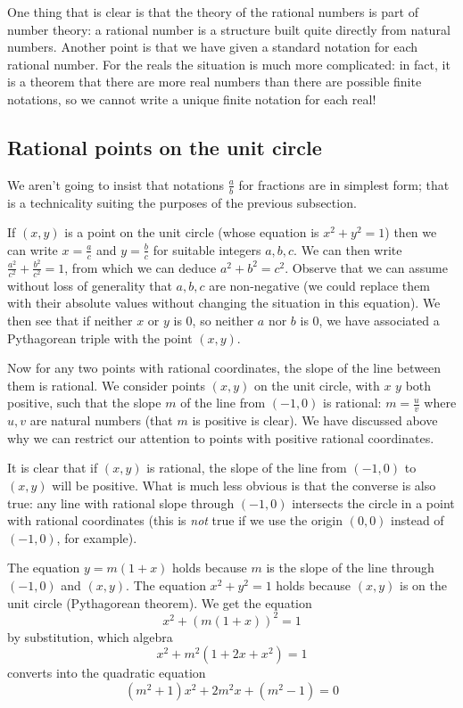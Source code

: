 \documentclass[12pt]{article}
\begin{document}
One thing that is clear is that the theory of the rational numbers is part of number theory:  a rational number is a structure built quite directly from natural numbers.  Another point is that we have given a standard notation for each rational number.   For the reals the situation is much more complicated:  in fact, it is a theorem that there are more real numbers than there are possible finite notations, so we cannot write a unique finite notation for each real!




\subsection{Rational points on the unit circle}

We aren't going to insist that notations $\frac ab$ for fractions are in simplest form; that is a technicality suiting the purposes of the previous subsection.

If $(x,y)$ is a point on the unit circle (whose equation is $x^2+y^2=1$) then we can write $x=\frac ac$ and $y=\frac bc$ for suitable integers $a,b,c$.  We can then write $\frac {a^2}{c^2} + \frac{b^2}{c^2}=1$, from which we can
deduce $a^2+b^2=c^2$.  Observe that we can assume without loss of generality that $a,b,c$ are non-negative
(we could replace them with their absolute values without changing the situation in this equation).  We then see that
if neither $x$ or $y$ is 0, so neither $a$ nor $b$ is 0, we have associated a Pythagorean triple with the point $(x,y)$.

Now for any two points with rational coordinates, the slope of the line between them is rational.  We consider
points $(x,y)$ on the unit circle, with $x$ $y$ both positive, such that the slope $m$ of the line from $(-1,0)$ is rational: $m=\frac uv$ where $u,v$ are natural numbers (that $m$ is positive is clear).  We have discussed above why we can restrict our attention to points with positive rational coordinates.

It is clear that if $(x,y)$ is rational, the slope of the line from $(-1,0)$ to $(x,y)$ will be positive.   What is much less obvious is that the converse is also true:  any line with rational slope through $(-1,0)$ intersects the circle in a point with rational coordinates (this is {\em not\/} true if we use the origin $(0,0)$ instead of $(-1,0)$, for example).

The equation $y=m(1+x)$ holds because $m$ is the slope of the line through $(-1,0)$ and $(x,y)$.   The equation
$x^2+y^2=1$ holds because $(x,y)$ is on the unit circle (Pythagorean theorem).  We get the equation
$$x^2 + (m(1+x))^2=1$$ by substitution, which algebra $$x^2 +m^2(1+2x+x^2)=1$$  converts into the quadratic equation
$$(m^2+1)x^2 + 2m^2x + (m^2-1)=0$$
\end{document}
